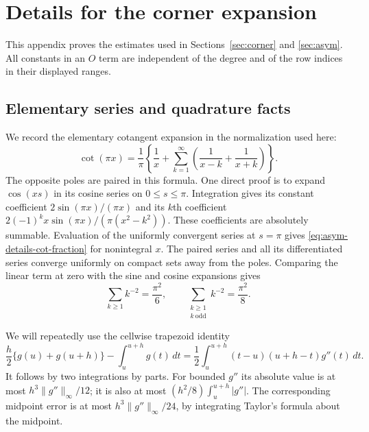 \section{Details for the corner expansion}\label{sec:asym-details}

This appendix proves the estimates used in Sections~\ref{sec:corner}
and \ref{sec:asym}.  All constants in an $O$ term are independent
of the degree and of the row indices in their displayed ranges.

\subsection{Elementary series and quadrature facts}
\label{sec:asym-details-elementary}

We record the elementary cotangent expansion in the normalization used
here:
\begin{equation}\label{eq:asym-details-cot-fraction}
 \cot(\pi x)=\frac1\pi\left\{\frac1x+
       \sum_{k=1}^{\infty}\left(\frac1{x-k}+\frac1{x+k}\right)\right\}.
\end{equation}
The opposite poles are paired in this formula.  One direct proof is to
expand $\cos(xs)$ in its cosine series on $0\leq s\leq\pi$.
Integration gives its constant coefficient
$2\sin(\pi x)/(\pi x)$ and its $k$th coefficient
$2(-1)^kx\sin(\pi x)/(\pi(x^2-k^2))$.  These coefficients are
absolutely summable.  Evaluation of the uniformly convergent series
at $s=\pi$ gives \eqref{eq:asym-details-cot-fraction} for
nonintegral $x$.  The paired series and all its differentiated series
converge uniformly on compact sets away from the poles.  Comparing the
linear term at zero with the sine and cosine expansions gives
\begin{equation}\label{eq:asym-details-square-sums}
 \sum_{k\geq1}k^{-2}=\frac{\pi^2}{6},\qquad
 \sum_{\substack{k\geq1\\k\ \mathrm{odd}}}k^{-2}=\frac{\pi^2}{8}.
\end{equation}

We will repeatedly use the cellwise trapezoid identity
\begin{equation}\label{eq:asym-details-trapezoid-kernel}
 \frac{h}{2}\{g(u)+g(u+h)\}-\int_u^{u+h}g(t)\,dt
   =\frac12\int_u^{u+h}(t-u)(u+h-t)g''(t)\,dt.
\end{equation}
It follows by two integrations by parts.  For bounded $g''$ its
absolute value is at most $h^3\|g''\|_\infty/12$; it is also at
most $(h^2/8)\int_u^{u+h}|g''|$.  The corresponding midpoint error
is at most $h^3\|g''\|_\infty/24$, by integrating Taylor's formula
about the midpoint.

